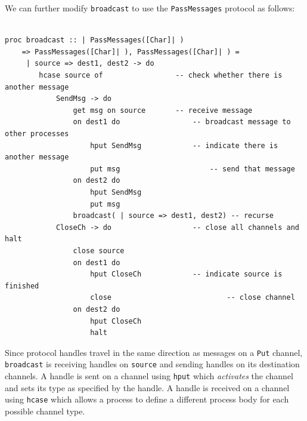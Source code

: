 \documentclass[11pt]{article}
\begin{document}
We can further modify \lstinline$broadcast$ to use the \lstinline$PassMessages$ protocol as follows:
\begin{lstlisting}[label=ex:recbroadcast, caption=Process that broadcasts messages from a single source (without confirmation)] %can we change listing so that it says Example insted of Listing in the caption?

proc broadcast :: | PassMessages([Char]| ) 
	=> PassMessages([Char]| ), PassMessages([Char]| ) = 
	 | source => dest1, dest2 -> do
		hcase source of					-- check whether there is another message
			SendMsg -> do
				get msg on source		-- receive message
				on dest1 do					-- broadcast message to other processes
					hput SendMsg			-- indicate there is another message
					put msg						-- send that message
				on dest2 do
					hput SendMsg
					put msg
				broadcast( | source => dest1, dest2) -- recurse
			CloseCh -> do					-- close all channels and halt
				close source							
				on dest1 do						
					hput CloseCh			-- indicate source is finished
					close							-- close channel
				on dest2 do
					hput CloseCh		
					halt	
\end{lstlisting}
Since protocol handles travel in the same direction as messages on a \lstinline$Put$ channel, \lstinline$broadcast$ is receiving handles on \lstinline$source$ and sending handles on its destination channels.
A handle is sent on a channel using \lstinline$hput$ which {\em activates} the channel and sets its type as specified by the handle.
A handle is received on a channel using \lstinline$hcase$ which allows a process to define a different process body for each possible channel type.

\end{document}
